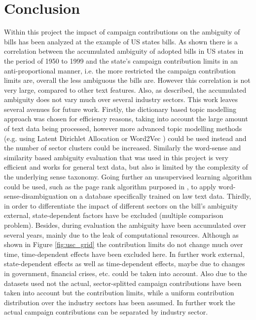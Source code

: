 \documentclass{custom_report}
\begin{document}
\chapter{Conclusion}
\label{cha:conclusion}
Within this project the impact of campaign contributions on the ambiguity of bills has been analyzed at the example of US states bills. As shown there is a correlation between the accumulated ambiguity of adopted bills in US states in the period of 1950 to 1999 and the state's campaign contribution limits in an anti-proportional manner, i.e. the more restricted the campaign contribution limits are, overall the less ambiguous the bills are. However this correlation is not very large, compared to other text features. Also, as described, the accumulated ambiguity does not vary much over several industry sectors. 
\newline
This work leaves several avenues for future work. Firstly, the dictionary based topic modelling approach was chosen for efficiency reasons, taking into account the large amount of text data being processed, however more advanced topic modelling methods (e.g. using Latent Dirichlet Allocation \cite{lda_topic_modeling} or Word2Vec \cite{word2vec}) could be used instead and the number of sector clusters could be increased. Similarly the word-sense and similarity based ambiguity evaluation that was used in this project is very efficient and works for general text data, but also is limited by the complexity of the underlying sense taxonomy. Going further an unsupervised learning algorithm could be used, such as the page rank algorithm purposed in \cite{knowledge_based_page_rank}, to apply word-sense-disambiguation on a database specifically trained on law text data. Thirdly, in order to differentiate the impact of different sectors on the bill's ambiguity external, state-dependent factors have be excluded (multiple comparison problem). Besides, during evaluation the ambiguity have been accumulated over several years, mainly due to the leak of computational resources. Although as shown in Figure \ref{fig:usc_grid} the contribution limits do not change much over time, time-dependent effects have been excluded here. In further work external, state-dependent effects as well as time-dependent effects, maybe due to changes in government, financial crises, etc. could be taken into account. Also due to the datasets used not the actual, sector-splitted campaign contributions have been taken into account but the contribution limits, while a uniform contribution distribution over the industry sectors has been assumed. In further work the actual campaign contributions can be separated by industry sector. 
\end{document}
